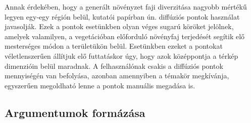Annak érdekében, hogy a generált növényzet faji diverzitása nagyobb mértékű legyen egy-egy régión belül, \cite{Gasch2022} kutatói papírban ún. diffúziós pontok használat javasolják. Ezek a pontok esetünkben olyan véges sugarú köröket jelölnek, amelyek valamilyen, a vegetációban előforduló növényfaj terjedését segítik elő mesterséges módon a területükön belül. Esetünkben ezeket a pontokat véletlenszerűen állítjuk elő futtatáskor úgy, hogy azok középpontja a térkép dimenzióin belül maradnak. A felhasználónak csakis a diffúziós pontok mennyiségén van befolyása, azonban amennyiben a témakör megkívánja, egyszerűen megoldható lenne a pontok manuális megadása is. 

\subsection{Argumentumok formázása}

